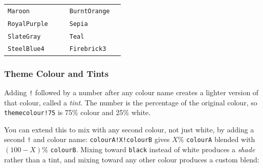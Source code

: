 \begin{tabularx}{\linewidth}{@{}lcclc@{}}
			\texttt{Maroon}    	 & \colorbox{Maroon}{\phantom{XXXXX}}    			& & \texttt{BurntOrange} & \colorbox{BurntOrange}{\phantom{XXXXX}}      \\
			
			\texttt{RoyalPurple} & \colorbox{RoyalPurple}{\phantom{XXXXX}}    		& & \texttt{Sepia}       & \colorbox{Sepia}{\phantom{XXXXX}}      \\
			
			\texttt{SlateGray}   & \colorbox{SlateGray}{\phantom{XXXXX}}    		& & \texttt{Teal}     	 & \colorbox{Teal}{\phantom{XXXXX}}     \\
			
			\texttt{SteelBlue4}	 & \colorbox{SteelBlue4}{\phantom{XXXXX}} 			& & \texttt{Firebrick3}  & \colorbox{Firebrick3}{\phantom{XXXXX}}     \\
		\end{tabularx}
		
		\subsubsection{Theme Colour and Tints}
		Adding \texttt{!} followed by a number after any colour name creates a lighter version of that colour, called a \textit{tint}. The number is the percentage of the original colour, so \texttt{themecolour!75} is 75\% colour and 25\% white.
		
		You can extend this to mix with any second colour, not just white, by adding a second \texttt{!} and colour name: \texttt{colourA!X!colourB} gives \(X\%\) \texttt{colourA} blended with \((100-X)\%\) \texttt{colourB}. Mixing toward \texttt{black} instead of white produces a \textit{shade} rather than a tint, and mixing toward any other colour produces a custom blend:
		
